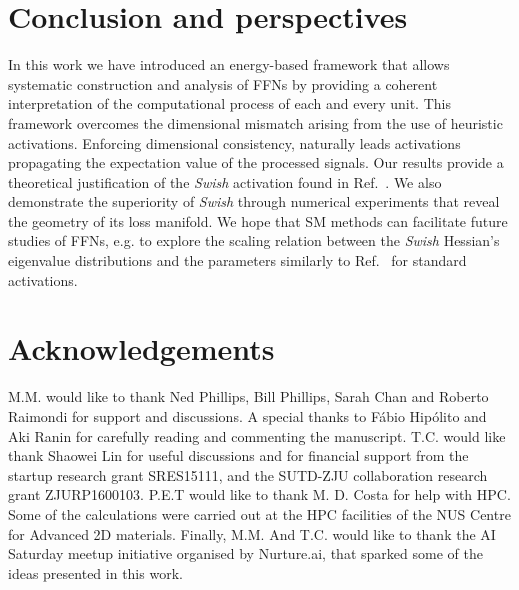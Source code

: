 \documentclass{article}
\begin{document}
\section{Conclusion and perspectives}
%
In this work we have introduced an energy-based framework that allows systematic construction and analysis of FFNs by providing a  coherent interpretation of the computational process of each and every unit. This framework overcomes the dimensional mismatch arising from the use of heuristic activations. Enforcing dimensional consistency, naturally leads activations propagating the expectation value of the processed signals. Our results provide a theoretical justification of the \textit{Swish} activation found in Ref.~\cite{prajit}. We also demonstrate the superiority of {\it Swish} through numerical experiments that reveal the geometry of its loss manifold. We hope that SM methods can facilitate future studies of FFNs, e.g. to explore the scaling relation between the {\it Swish} Hessian's eigenvalue distributions and the parameters similarly to Ref.~\cite{penn1} for standard activations.

\section{Acknowledgements}

M.M. would like to thank Ned Phillips, Bill Phillips, Sarah Chan and Roberto Raimondi for support and discussions. A special thanks to  F\'abio Hip\'olito and Aki Ranin for carefully reading and commenting the manuscript. T.C. would like thank Shaowei Lin for useful discussions and for financial support from the startup research grant
SRES15111, and the SUTD-ZJU collaboration research\\
grant ZJURP1600103. P.E.T would like to thank M. D. Costa for help with HPC. Some of the calculations were carried out at the HPC facilities of the NUS Centre for Advanced 2D materials. Finally, M.M. And T.C. would like to thank the AI Saturday meetup initiative organised by Nurture.ai, that sparked some of the ideas presented in this work.

\appendix
\end{document}

